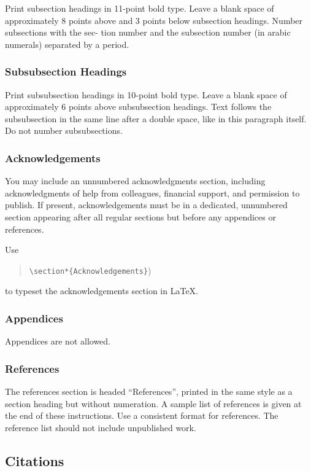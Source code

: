 \documentclass{article}
\begin{document}
Print subsection headings in 11-point bold type. Leave a blank space of
approximately 8 points above and 3 points below subsection headings. Number
subsections with the sec- tion number and the subsection number (in arabic
numerals) separated by a period.

\subsubsection{Subsubsection Headings}

Print subsubsection headings in 10-point bold type. Leave a blank space of
approximately 6 points above subsubsection headings. Text follows the
subsubsection in the same line after a double space, like in this paragraph
itself. Do not number subsubsections.

\subsubsection{Acknowledgements}

You may include an unnumbered acknowledgments section, including
acknowledgments of help from colleagues, financial support, and permission to
publish. If present, acknowledgements must be in a dedicated, unnumbered
section appearing after all regular sections but before any appendices or
references.

Use
\begin{quote}
  \texttt{\textbackslash{}section*\{Acknowledgements\}})
\end{quote}
to typeset the acknowledgements section in \LaTeX{}.

\subsubsection{Appendices}

Appendices are not allowed.

\subsubsection{References}

The references section is headed ``References'', printed in the same
style as a section heading but without numeration. A sample list of
references is given at the end of these instructions. Use a consistent
format for references. The reference list should not include unpublished
work.

\subsection{Citations}
\end{document}
